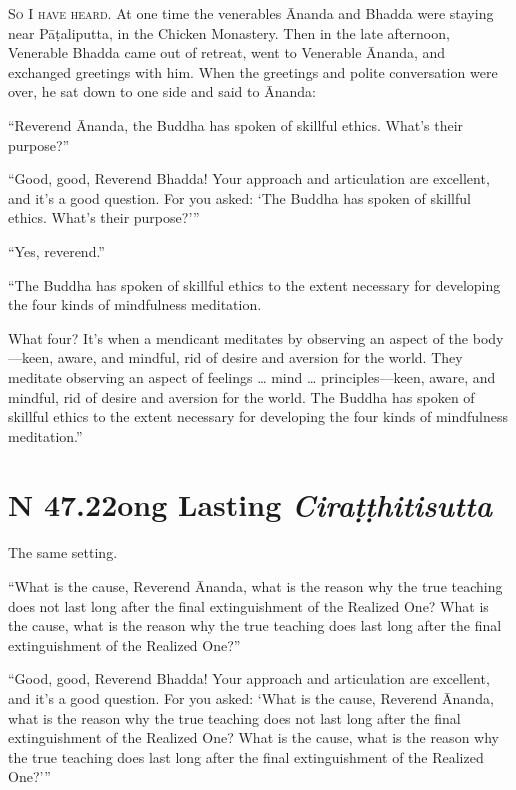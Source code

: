 \documentclass[12pt,openany]{book}%
\newcommand*{\suttatitleacronym}[1]{\smaller[2]{#1}\vspace*{.3em}}
\newcommand*{\suttatitletranslation}[1]{\linebreak{#1}}
\newcommand*{\suttatitleroot}[1]{\linebreak\smaller[2]\itshape{#1}}
\newcommand*{\tocacronym}[1]{\hspace*{-3.3em}{#1}\quad}
\newcommand*{\toctranslation}[1]{#1}
\newcommand*{\tocroot}[1]{(\textit{#1})}
\newcommand*{\scevam}[1]{\textsc{#1}}
\begin{document}
\scevam{So I have heard. }At one time the venerables Ānanda and Bhadda were staying near \textsanskrit{Pāṭaliputta}, in the Chicken Monastery. Then in the late afternoon, Venerable Bhadda came out of retreat, went to Venerable Ānanda, and exchanged greetings with him. When the greetings and polite conversation were over, he sat down to one side and said to Ānanda: 

“Reverend Ānanda, the Buddha has spoken of skillful ethics. What’s their purpose?” 

“Good, good, Reverend Bhadda! Your approach and articulation are excellent, and it’s a good question. For you asked: ‘The Buddha has spoken of skillful ethics. What’s their purpose?’” 

“Yes, reverend.” 

“The Buddha has spoken of skillful ethics to the extent necessary for developing the four kinds of mindfulness meditation. 

What four? It’s when a mendicant meditates by observing an aspect of the body—keen, aware, and mindful, rid of desire and aversion for the world. They meditate observing an aspect of feelings … mind … principles—keen, aware, and mindful, rid of desire and aversion for the world. The Buddha has spoken of skillful ethics to the extent necessary for developing the four kinds of mindfulness meditation.” 

%
\section*{{\suttatitleacronym SN 47.22}{\suttatitletranslation Long Lasting }{\suttatitleroot Ciraṭṭhitisutta}}
\addcontentsline{toc}{section}{\tocacronym{SN 47.22} \toctranslation{Long Lasting } \tocroot{Ciraṭṭhitisutta}}

The same setting. 

“What is the cause, Reverend Ānanda, what is the reason why the true teaching does not last long after the final extinguishment of the Realized One? What is the cause, what is the reason why the true teaching does last long after the final extinguishment of the Realized One?” 

“Good, good, Reverend Bhadda! Your approach and articulation are excellent, and it’s a good question. For you asked: ‘What is the cause, Reverend Ānanda, what is the reason why the true teaching does not last long after the final extinguishment of the Realized One? What is the cause, what is the reason why the true teaching does last long after the final extinguishment of the Realized One?’” 
\end{document}
